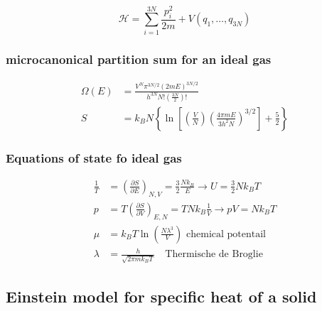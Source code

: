 \begin{equation*}
    \mathcal{H} = \sum_{i=1}^{3N} \frac{p_i^2}{2m} + V(q_1, \dots, q_{3N})
\end{equation*}

\subsubsection*{microcanonical partition sum for an ideal gas}

\begin{equation*}
    \begin{aligned}
        \Omega(E) &= \frac{V^N \pi^{3N/2} (2mE)^{3N/2}}{h^{3N}N!\left( \frac{3N}{2} \right)!} \\
        S &= k_B N \left\lbrace \ln \left[ \left( \frac{V}{N} \right) \left( \frac{4 \pi m E}{3 h^2 N} \right)^{3/2} \right] + \frac{5}{2}\right\rbrace
    \end{aligned}
\end{equation*}


\subsubsection*{Equations of state fo ideal gas}

\begin{equation*}
    \begin{aligned}
        \frac{1}{T} &= \left(\frac{\partial S}{\partial E}\right)_{N,V} = \frac{3}{2} \frac{Nk_B}{E} \rightarrow U = \frac{3}{2} N k_B T \\
        p &= T\left(\frac{\partial S}{\partial V}\right)_{E,N} = TNk_B \frac{1}{V}\rightarrow pV = N k_B T \\
        \mu &= k_B T \ln \left(\frac{N\lambda^3}{V}\right) \text{ chemical potentail} \\
        \lambda &= \frac{h}{\sqrt{2 \pi m k_B T}} \quad \text{Thermische de Broglie}
    \end{aligned}
\end{equation*}

\subsection*{Einstein model for specific heat of a solid}

